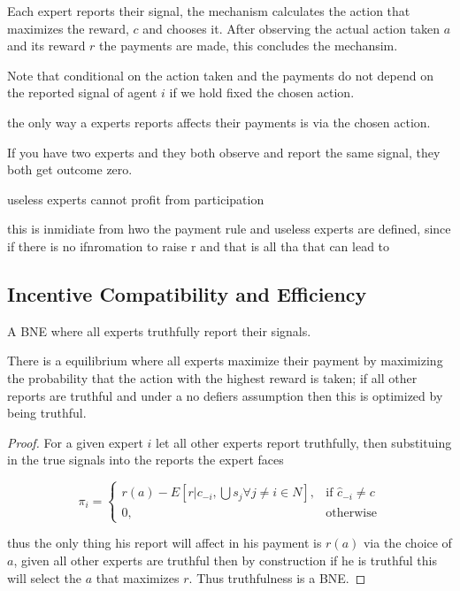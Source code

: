 Each expert reports their signal, the mechanism calculates the action that maximizes the reward, $c$ and chooses it. After observing the actual action taken $a$ and its reward $r$ the payments are made, this concludes the mechansim.

Note that conditional on the action taken and the payments do not depend on the reported signal of agent $i$ if we hold fixed the chosen action. 

\begin{lem}
	the only way a experts reports affects their payments is via the chosen action.
\end{lem}

\begin{eg}
	If you have two experts and they both observe and report the same signal, they both get outcome zero. 
\end{eg}


\begin{lem}
	useless experts cannot profit from participation
\end{lem}

this is inmidiate from hwo the payment rule and useless experts are defined, since if there is no ifnromation to raise r and that is all tha that can lead to 

\subsection{Incentive Compatibility and Efficiency}


\begin{defn}
	A BNE where all experts truthfully report their signals.
\end{defn}

There is a  equilibrium where all experts maximize their payment by maximizing the probability that the action with the highest reward is taken; if all other reports are truthful and under a no defiers assumption then this is optimized by being truthful.

\begin{proof}
For a given expert $i$ let all other experts report truthfully, then substituing in the true signals into the reports the expert faces 


\[
    \pi_i = 
\begin{cases}
    r(a) -  E[ r| c_{-i}, \bigcup s_j  \forall j \neq i \in N] ,& \text{if } \hat{c}_{-i} \neq c\\
    0,              & \text{otherwise}
\end{cases}
\]

thus the only thing his report will affect in his payment is $r(a)$ via the choice of $a$, given all other experts are truthful then by construction if he is truthful this will select the $a$ that maximizes $r$. Thus truthfulness is a BNE.

\end{proof}


